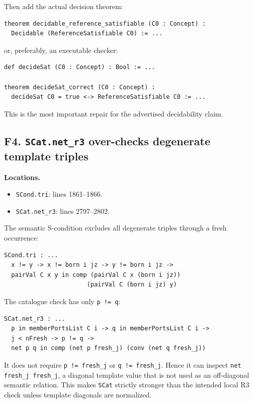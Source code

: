 \documentclass[11pt]{article}
\begin{document}
Then add the actual decision theorem:

\begin{lstlisting}
theorem decidable_reference_satisfiable (C0 : Concept) :
  Decidable (ReferenceSatisfiable C0) := ...
\end{lstlisting}

or, preferably, an executable checker:

\begin{lstlisting}
def decideSat (C0 : Concept) : Bool := ...

theorem decideSat_correct (C0 : Concept) :
  decideSat C0 = true <-> ReferenceSatisfiable C0 := ...
\end{lstlisting}

This is the most important repair for the advertised decidability claim.

\subsection{F4. \texttt{SCat.net\_r3} over-checks degenerate template triples}

\textbf{Locations.}
\begin{itemize}
  \item \texttt{SCond.tri}: lines 1861--1866.
  \item \texttt{SCat.net\_r3}: lines 2797--2802.
\end{itemize}

The semantic S-condition excludes all degenerate triples through a fresh
occurrence:

\begin{lstlisting}
SCond.tri : ...
  x != y -> x != born i jz -> y != born i jz ->
  pairVal C x y in comp (pairVal C x (born i jz))
                       (pairVal C (born i jz) y)
\end{lstlisting}

The catalogue check has only \texttt{p != q}:

\begin{lstlisting}
SCat.net_r3 : ...
  p in memberPortsList C i -> q in memberPortsList C i ->
  j < nFresh -> p != q ->
  net p q in comp (net p fresh_j) (conv (net q fresh_j))
\end{lstlisting}

It does not require \texttt{p != fresh\_j} or \texttt{q != fresh\_j}.  Hence
it can inspect \texttt{net fresh\_j fresh\_j}, a diagonal template value that
is not used as an off-diagonal semantic relation.  This makes \texttt{SCat}
strictly stronger than the intended local R3 check unless template diagonals are
normalized.
\end{document}
